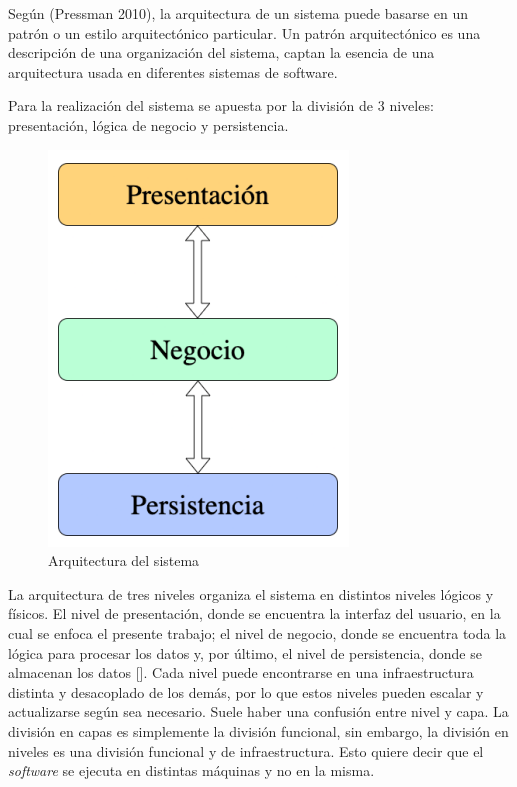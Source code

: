 Según (Pressman 2010), la arquitectura de un sistema puede basarse en un patrón o un estilo arquitectónico particular. Un patrón arquitectónico es una descripción de una organización del sistema, captan la esencia de una arquitectura usada en diferentes sistemas de software.


Para la realización del sistema se apuesta por la división de 3 niveles: presentación, lógica de negocio y persistencia. 

\begin{figure}[htp]
\centering
\includegraphics[scale=0.9]{Graphics/levels}
\caption{Arquitectura del sistema}
\label{fig:3levels}
\end{figure}

La arquitectura de tres niveles organiza el sistema en distintos niveles lógicos y físicos. El nivel de presentación, donde se encuentra la interfaz del usuario, en la cual se enfoca el presente trabajo; el nivel de negocio, donde se encuentra toda la lógica para procesar los datos y, por último, el nivel de persistencia, donde se almacenan los datos [\cite{96}]. Cada nivel puede encontrarse en una infraestructura distinta y desacoplado de los demás, por lo que estos niveles pueden escalar y actualizarse según sea necesario. Suele haber una confusión entre nivel y capa. La división en capas es simplemente la división funcional, sin embargo, la división en niveles es una división funcional y de infraestructura. Esto quiere decir que el \textit{software} se ejecuta en distintas máquinas y no en la misma.

